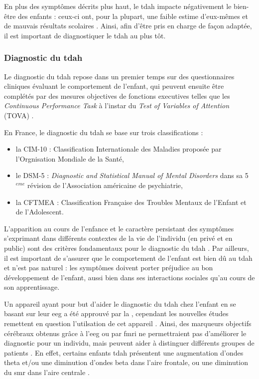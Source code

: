 
En plus des symptômes décrits plus haut, le \gls{tdah} impacte négativement le bien-être des enfants : ceux-ci ont, pour la plupart, une faible estime d'eux-mêmes 
\citep{Shaw2005} et de mauvais résultats scolaires \citep{Barry2002}. Ainsi, afin d'être pris en charge de façon adaptée, il est important de diagnostiquer 
le \gls{tdah} au plus tôt. 

\subsubsection{Diagnostic du \gls{tdah}}

Le diagnostic du \gls{tdah} repose dans un premier temps sur des questionnaires cliniques évaluant le comportement de l'enfant, qui peuvent ensuite être
complétés par des mesures objectives de fonctions executives telles que les \textit{Continuous Performance Task} \citep{Barkley1991} à l'instar du 
\textit{Test of Variables of Attention} (TOVA) \citep{Forbes1998}.

En France, le diagnostic du \gls{tdah} se base sur trois classifications \citep{HAS} :
\begin{itemize}
\item la CIM-10 : Classification Internationale des Maladies proposée par l'Orgnisation Mondiale de la Santé,
\item le DSM-5 : \textit{Diagnostic and Statistical Manual of Mental Disorders} dans sa 5$^{eme}$ révision de l'Association américaine de
psychiatrie,
\item la CFTMEA : Classification Française des Troubles Mentaux de l’Enfant et de l’Adolescent.
\end{itemize}

L'apparition au cours de l'enfance et le caractère persistant des symptômes s'exprimant dans différents contextes de la vie de l'individu (en privé et 
en public) sont des critères fondamentaux pour le diagnostic du \gls{tdah} \citep{HAS}. Par ailleurs, il est important de s'assurer que le comportement de
l'enfant est bien dû au \gls{tdah} et n'est pas naturel : les symptômes doivent porter préjudice au bon développement de l'enfant, aussi bien dans ses
interactions sociales qu'au cours de son apprentissage. 

Un appareil ayant pour but d'aider le diagnostic du \gls{tdah} chez l'enfant en se basant sur leur \gls{eeg} 
a été approuvé par la \citet{FDA} \citep{NebaHealth}, cependant les nouvelles études remettent en question l'utilsation de cet appareil \citep{Arns2013, 
Zhang2017}. Ainsi, des marqueurs objectifs cérébraux obtenus grâce à l'\gls{eeg} ou par \gls{fmri} ne permettraient pas d'améliorer le diagnostic pour un individu, mais
peuvent aider à distinguer différents groupes de patients \citep{Johnstone2005, Zhang2017, Clarke2011}. En effet, certains enfants \gls{tdah} 
présentent une augmentation d'ondes theta et/ou une diminution d'ondes beta dans l'aire frontale, ou une diminution du \gls{smr} dans l'aire centrale
\citep{Monastra2005, Janzen1995, Loo2018}. 

